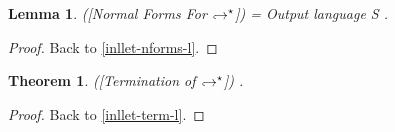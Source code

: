 \documentclass[a4paper,11pt,oneside]{article}
\theoremstyle{plain}
\newtheorem{lemma}[definition]{Lemma}
\newtheorem{theorem}[definition]{Theorem}
\newcommand{\tmlet}[3]{let~#1=#2~in~#3}
\newcommand{\tmsbst}[3]{#1 [#2 \mapsfrom #3] }
\newcommand{\bth}{\bot_\theta}
\newcommand{\brh}{\bot_\rho}
\newcommand{\inlsrc}{\textit{ML}^{^2}}
\newcommand{\inlT}{\inlsrc}
\newcommand{\hookdownarrow}{\mathrel{\rotatebox[origin=c]{180}{$\hookleftarrow$}}}
\newcommand{\inlletarr}{\hookdownarrow}
\newcommand{\inllet}[2]{#1 \hookdownarrow #2}
\begin{document}
%
%	
%
%	
%
	
	
\begin{lemma}([Normal Forms For $\inlletarr^\star$]) = Output language S
 \label{inllet-nforms-p}.
\end{lemma}
\begin{proof}
Back to \ref{inllet-nforms-l}.
\end{proof}


\begin{theorem}([Termination of $\inlletarr^\star$])
\label{inllet-term-p}.
\end{theorem}
\begin{proof}
  Back to \ref{inllet-term-l}.
\end{proof}	
	
\end{document}
